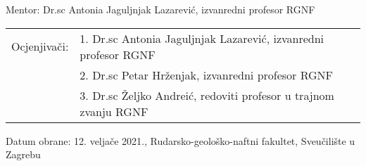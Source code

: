 {{\vskip 6mm
Mentor: Dr.sc Antonia Jaguljnjak Lazarević, izvanredni profesor RGNF
\vskip 5mm

\begin{tabular}{@{}l l}
    Ocjenjivači: & 1. Dr.sc Antonia Jaguljnjak Lazarević, izvanredni profesor RGNF\\
                 & 2. Dr.sc Petar Hrženjak, izvanredni profesor RGNF \\
                 & 3. Dr.sc Željko Andreić, redoviti profesor u trajnom zvanju RGNF
\end{tabular}

\vfill

Datum obrane: 12. veljače 2021., Rudarsko-geološko-naftni fakultet, Sveučilište u
Zagrebu
}}
\newpage
